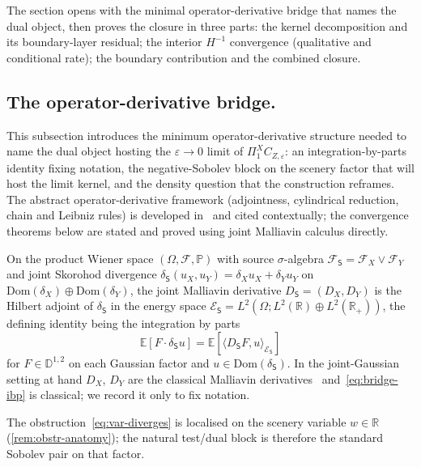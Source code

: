 \documentclass[EJP]{ejpecp}
\newcommand{\R}{\mathbb{R}}
\renewcommand{\E}{\mathbb{E}}
\newcommand{\Prob}{\mathbb{P}}
\newcommand{\Dom}{\mathrm{Dom}}
\newcommand{\Energy}{\mathcal{E}}
\newcommand{\Source}{\mathsf{S}}
\newcommand{\IBM}{Z}
\newcommand{\Pir}{\Pi}
\begin{document}
The section opens with the minimal operator-derivative bridge that
names the dual object, then proves the closure in three parts: the
kernel decomposition and its boundary-layer residual; the interior
$H^{-1}$ convergence (qualitative and conditional rate); the
boundary contribution and the combined closure.

\subsection*{The operator-derivative bridge.}\label{sec:bridge}

This subsection introduces the minimum operator-derivative structure
needed to name the dual object hosting the $\varepsilon\to 0$ limit
of $\Pir_1^X C_{\IBM,\varepsilon}$: an integration-by-parts identity
fixing notation, the negative-Sobolev block on the scenery factor
that will host the limit kernel, and the density question that the
construction reframes. The abstract operator-derivative framework
(adjointness, cylindrical reduction, chain and Leibniz rules) is
developed in~\cite{Fontes-OperatorDerivative} and cited contextually;
the convergence theorems below are stated and proved using joint
Malliavin calculus directly.

On the product Wiener space $(\Omega,\mathcal F,\Prob)$ with source
$\sigma$-algebra $\mathcal F_\Source=\mathcal F_X\vee\mathcal F_Y$
and joint Skorohod divergence
$\delta_\Source(u_X,u_Y)=\delta_X u_X+\delta_Y u_Y$ on
$\Dom(\delta_X)\oplus\Dom(\delta_Y)$, the joint Malliavin derivative
$D_\Source=(D_X,D_Y)$ is the Hilbert adjoint of $\delta_\Source$ in
the energy space $\Energy_\Source=L^{2}(\Omega;L^{2}(\R)\oplus L^{2}(\R_{+}))$,
the defining identity being the integration by parts
\begin{equation}\label{eq:bridge-ibp}
  \E[F\cdot\delta_\Source u]=\E[\langle D_\Source F,u\rangle_{\Energy_\Source}]
\end{equation}
for $F\in\mathbb D^{1,2}$ on each Gaussian factor and
$u\in\Dom(\delta_\Source)$. In the joint-Gaussian setting at hand
$D_X$, $D_Y$ are the classical Malliavin derivatives~\cite{Nualart,Janson}
and~\eqref{eq:bridge-ibp} is classical; we record it only to fix
notation.

The obstruction~\eqref{eq:var-diverges} is localised on the scenery
variable $w\in\R$ (\cref{rem:obstr-anatomy}); the natural test/dual
block is therefore the standard Sobolev pair on that factor.
\end{document}
